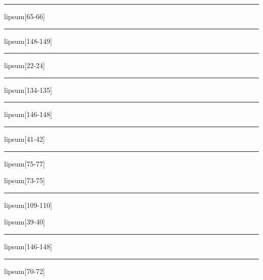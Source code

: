 \documentclass[11pt,a4paper]{article}
\begin{document}
\begin{simplewrap}
  \textcolor{violet!40}{\rule{4.4cm}{4.7cm}}
\end{simplewrap}
lipsum[65-66]

\begin{simplewrap}
  \textcolor{red!17}{\rule{5.5cm}{5.2cm}}
\end{simplewrap}
lipsum[148-149]

\begin{simplewrap}
  \textcolor{blue!19}{\rule{3.4cm}{6.5cm}}
\end{simplewrap}
lipsum[22-24]

\begin{simplewrap}
  \textcolor{orange!45}{\rule{5.3cm}{6.9cm}}
\end{simplewrap}
lipsum[134-135]

\begin{simplewrap}
  \textcolor{blue!29}{\rule{5.6cm}{9.9cm}}
\end{simplewrap}
lipsum[146-148]

\begin{simplewrap}
  \textcolor{orange!58}{\rule{3.6cm}{3.7cm}}
\end{simplewrap}
lipsum[41-42]

\begin{simplewrap}
  \textcolor{magenta!14}{\rule{3.5cm}{5.3cm}}
\end{simplewrap}
lipsum[75-77]

lipsum[73-75]

\begin{simplewrap}
  \textcolor{blue!14}{\rule{5.1cm}{9.4cm}}
\end{simplewrap}
lipsum[109-110]

lipsum[39-40]

\begin{simplewrap}
  \textcolor{teal!19}{\rule{3.2cm}{3.3cm}}
\end{simplewrap}
lipsum[146-148]

\begin{simplewrap}
  \textcolor{blue!17}{\rule{4.4cm}{4.4cm}}
\end{simplewrap}
lipsum[70-72]
\end{document}

